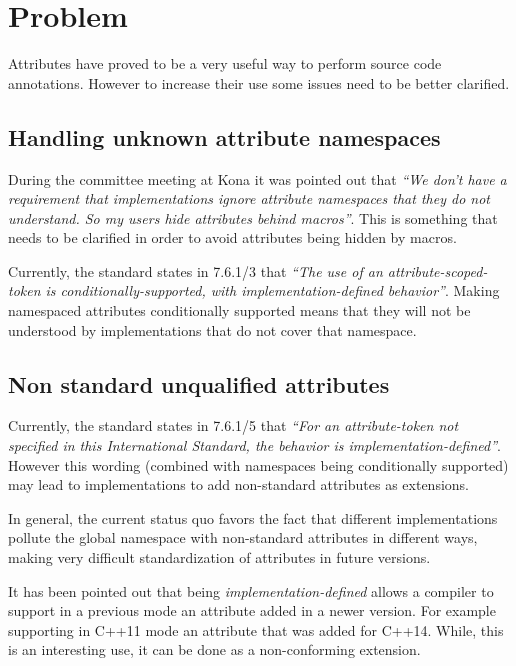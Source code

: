\section{Problem}

Attributes have proved to be a very useful way to perform
source code annotations. However to increase their use some
issues need to be better clarified.

\subsection{Handling unknown attribute namespaces}

During the committee meeting at Kona it was pointed out that \emph{``We don't
have a requirement that implementations ignore attribute namespaces that they
do not understand. So my users hide attributes behind macros''}. This is something
that needs to be clarified in order to avoid attributes being hidden by macros.

Currently, the standard states in 7.6.1/3 that \emph{``The use of an
attribute-scoped-token is conditionally-supported, with implementation-defined
behavior''}. Making namespaced attributes conditionally supported means that
they will not be understood by implementations that do not cover that namespace.

\subsection{Non standard unqualified attributes}

Currently, the standard states in 7.6.1/5 that \emph{``For an attribute-token
not specified in this International Standard, the behavior is
implementation-defined''}. However this wording (combined with namespaces being
conditionally supported) may lead to implementations to add non-standard attributes
as extensions.

In general, the current status quo favors the fact that different implementations
pollute the global namespace with non-standard attributes in different ways, making
very difficult standardization of attributes in future versions.

It has been pointed out that being \emph{implementation-defined} allows a compiler
to support in a previous mode an attribute added in a newer version. For example
supporting in C++11 mode an attribute that was added for C++14. While, this is an
interesting use, it can be done as a non-conforming extension.
